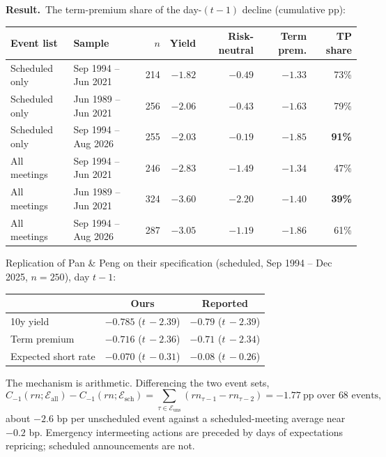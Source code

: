 \documentclass[11pt]{article}
\newcommand{\res}[1]{\vspace{0.4em}\noindent\textbf{Result.}\ #1}
\begin{document}
\res{The term-premium share of the day-$(t\!-\!1)$ decline (cumulative pp):}
\begin{table}[h]\centering\small
\begin{tabular}{llrrrrr}
\toprule
Event list & Sample & $n$ & Yield & Risk-neutral & Term prem. & TP share\\
\midrule
Scheduled only & Sep 1994 -- Jun 2021 & 214 & $-1.82$ & $-0.49$ & $-1.33$ & 73\%\\
Scheduled only & Jun 1989 -- Jun 2021 & 256 & $-2.06$ & $-0.43$ & $-1.63$ & 79\%\\
Scheduled only & Sep 1994 -- Aug 2026 & 255 & $-2.03$ & $-0.19$ & $-1.85$ & \textbf{91\%}\\
All meetings & Sep 1994 -- Jun 2021 & 246 & $-2.83$ & $-1.49$ & $-1.34$ & 47\%\\
All meetings & Jun 1989 -- Jun 2021 & 324 & $-3.60$ & $-2.20$ & $-1.40$ & \textbf{39\%}\\
All meetings & Sep 1994 -- Aug 2026 & 287 & $-3.05$ & $-1.19$ & $-1.86$ & 61\%\\
\bottomrule
\end{tabular}
\end{table}

\noindent Replication of Pan \& Peng on their specification (scheduled, Sep 1994 -- Dec 2025, $n=250$), day $t\!-\!1$:
\begin{center}\small
\begin{tabular}{lcc}
\toprule
& Ours & Reported\\ \midrule
10y yield & $-0.785$ ($t\,{-}2.39$) & $-0.79$ ($t\,{-}2.39$)\\
Term premium & $-0.716$ ($t\,{-}2.36$) & $-0.71$ ($t\,{-}2.34$)\\
Expected short rate & $-0.070$ ($t\,{-}0.31$) & $-0.08$ ($t\,{-}0.26$)\\
\bottomrule\end{tabular}
\end{center}

\noindent The mechanism is arithmetic. Differencing the two event sets,
\begin{equation}
C_{-1}(rn;\mathcal E_{\text{all}})-C_{-1}(rn;\mathcal E_{\text{sch}})=\sum_{\tau\in\mathcal E_{\text{uns}}}\left(rn_{\tau-1}-rn_{\tau-2}\right)=-1.77\ \text{pp over }68\text{ events},
\end{equation}
about $-2.6$ bp per unscheduled event against a scheduled-meeting average near $-0.2$ bp. Emergency intermeeting actions are preceded by days of expectations repricing; scheduled announcements are not.
\end{document}
